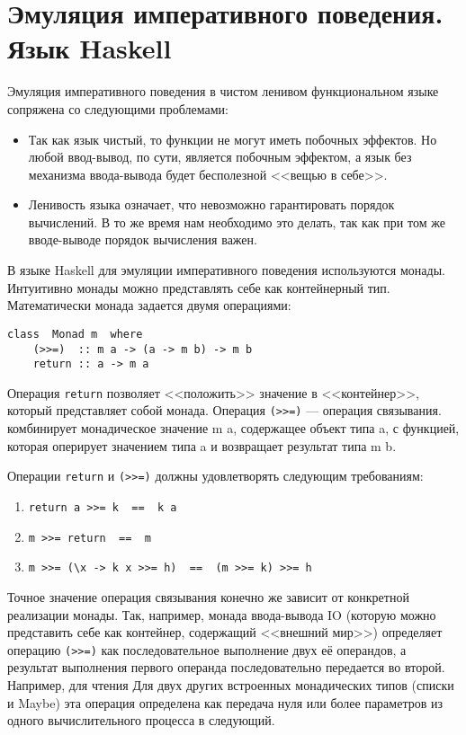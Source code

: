 \section{Эмуляция императивного поведения. Язык Haskell}
Эмуляция императивного поведения в чистом ленивом функциональном языке
сопряжена со следующими проблемами:
\begin{itemize}
\item Так как язык чистый, то функции не могут иметь побочных
  эффектов. Но любой ввод-вывод, по сути, является побочным эффектом,
  а язык без механизма ввода-вывода будет бесполезной <<вещью в
  себе>>.
\item Ленивость языка означает, что невозможно гарантировать порядок
  вычислений. В то же время нам необходимо это делать, так как при том
  же вводе-выводе порядок вычисления важен.
\end{itemize}

В языке Haskell для эмуляции императивного поведения используются
монады. Интуитивно монады можно представлять себе как контейнерный
тип. Математически монада задается двумя операциями:
\begin{verbatim}
class  Monad m  where
    (>>=)  :: m a -> (a -> m b) -> m b
    return :: a -> m a
\end{verbatim}
Операция \texttt{return} позволяет <<положить>> значение в
<<контейнер>>, который представляет собой монада. Операция
\verb|(>>=)| --- операция связывания. комбинирует монадическое
значение m a, содержащее объект типа a, с функцией, которая оперирует
значением типа a и возвращает результат типа m b.

Операции \texttt{return} и \verb|(>>=)| должны удовлетворять
следующим требованиям:
\begin{enumerate}
\item \verb|return a >>= k  ==  k a|
\item \verb|m >>= return  ==  m|
\item \verb|m >>= (\x -> k x >>= h)  ==  (m >>= k) >>= h|
\end{enumerate}

Точное значение операция связывания конечно же зависит от конкретной
реализации монады. Так, например, монада ввода-вывода IO (которую
можно представить себе как контейнер, содержащий <<внешний мир>>)
определяет операцию \verb|(>>=)| как последовательное выполнение двух её
операндов, а результат выполнения первого операнда последовательно
передается во второй. Например, для чтения Для двух других встроенных монадических типов
(списки и Maybe) эта операция определена как передача нуля или более
параметров из одного вычислительного процесса в следующий.

